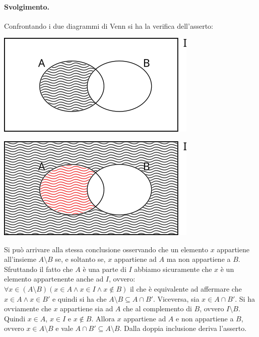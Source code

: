 \paragraph*{Svolgimento.} Confrontando i due diagrammi di Venn si ha la verifica dell'asserto:
\begin{center}
	\begin{minipage}{.45\textwidth}
		\centering
		\includegraphics[scale=.6]{res/Venn_Esercizio11}
	\end{minipage}
	\hfil
	\begin{minipage}{.45\textwidth}
		\centering
		\includegraphics[scale=.6]{res/Venn_Esercizio12}
	\end{minipage}
\end{center}
Si può arrivare alla stessa conclusione osservando che un elemento $x$ appartiene all'insieme $A \setminus B$ se, e soltanto se, $x$ appartiene ad $A$ ma non appartiene a $B$. Sfruttando il fatto che $A$ è una parte di $I$ abbiamo sicuramente che $x$ è un elemento appartenente anche ad $I$, ovvero: $\forall x \in (A \setminus B) (x \in A \land x \in I \land x \notin B)$ il che è equivalente ad affermare che $x \in A \land x \in B'$ e quindi si ha che $A \setminus B \subseteq A \cap B'$. Viceversa, sia $x \in A \cap B'$. Si ha ovviamente che $x$ appartiene sia ad $A$ che al complemento di $B$, ovvero $I \setminus B$. Quindi $x \in A$, $x \in I$ e $x \notin B$. Allora $x$ appartiene ad $A$ e non appartiene a $B$, ovvero $x \in A \setminus B$ e vale $A \cap B' \subseteq A \setminus B$. Dalla doppia inclusione deriva l'asserto. \hfill \blacksquare

